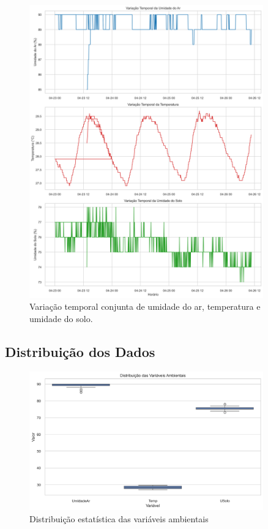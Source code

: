 \documentclass[12pt, a4paper]{article}
\begin{document}
\begin{figure}[H]
\centering
\includegraphics[width=0.9\textwidth]{graficos/temporal_combinado.png}
\caption{Variação temporal conjunta de umidade do ar, temperatura e umidade do solo.}
\label{fig:temporal_combinado}
\end{figure}

\subsection{Distribuição dos Dados}
\begin{figure}[H]
\centering
\includegraphics[width=0.9\textwidth]{graficos/boxplot_variaveis.png}
\caption{Distribuição estatística das variáveis ambientais}
\label{fig:boxplot}
\end{figure}
\end{document}

